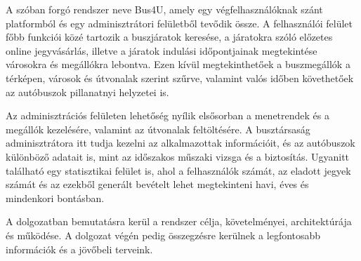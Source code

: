 A szóban forgó rendszer neve Bus4U, amely egy végfelhasználóknak szánt platformból és egy adminisztrátori felületből tevődik össze. A felhasználói felület főbb funkciói közé tartozik a buszjáratok keresése, a járatokra szóló előzetes online jegyvásárlás, illetve a járatok indulási időpontjainak megtekintése városokra és megállókra lebontva. Ezen kívül megtekinthetőek a buszmegállók a térképen, városok és útvonalak szerint szűrve, valamint valós időben követhetőek az autóbuszok pillanatnyi helyzetei is.

Az adminisztrációs felületen lehetőség nyílik elsősorban a menetrendek és a megállók kezelésére, valamint az útvonalak feltöltésére. A busztársaság adminisztrátora itt tudja kezelni az alkalmazottak információit, és az autóbuszok különböző adatait is, mint az időszakos műszaki vizsga és a biztosítás. Ugyanitt található egy statisztikai felület is, ahol a felhasználók számát, az eladott jegyek számát és az ezekből generált bevételt lehet megtekinteni havi, éves és mindenkori bontásban.

A dolgozatban bemutatásra kerül a rendszer célja, követelményei, architektúrája és működése. A dolgozat végén pedig összegzésre kerülnek a legfontosabb információk és a jövőbeli terveink.

